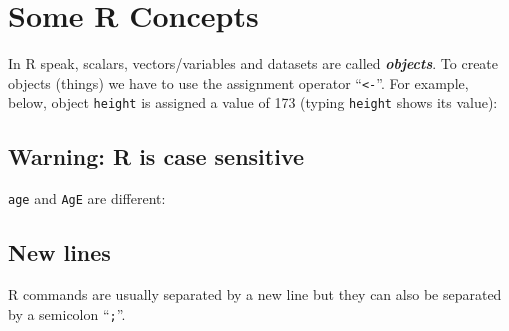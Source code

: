 \documentclass[letterpaperpaper,9pt,twocolumn,twoside,printwatermark=false]{pinp}
\begin{document}
\hypertarget{some-r-concepts}{%
\section{Some R Concepts}\label{some-r-concepts}}

In R speak, scalars, vectors/variables and datasets are called
\textbf{\emph{objects}}. To create objects (things) we have to use the
assignment operator ``\texttt{\textless{}-}''. For example, below,
object \texttt{height} is assigned a value of 173 (typing
\texttt{height} shows its value):

\begin{Shaded}
\begin{Highlighting}[]
\StringTok{ }
\end{Highlighting}
\end{Shaded}

\hypertarget{warning-r-is-case-sensitive}{%
\subsection{Warning: R is case
sensitive}\label{warning-r-is-case-sensitive}}

\texttt{age} and \texttt{AgE} are different:

\begin{Shaded}
\begin{Highlighting}[]
\StringTok{ }
\StringTok{ }
\end{Highlighting}
\end{Shaded}

\begin{Shaded}
\begin{Highlighting}[]
\end{Highlighting}
\end{Shaded}

\hypertarget{new-lines}{%
\subsection{New lines}\label{new-lines}}

R commands are usually separated by a new line but they can also be
separated by a semicolon ``\texttt{;}''.

\begin{Shaded}
\begin{Highlighting}[]
\StringTok{ }
\end{Highlighting}
\end{Shaded}
\end{document}
